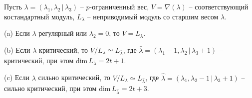 \begin{proposition}
Пусть $ \lambda = (\lambda_1, \lambda_2 \,|\, \lambda_3) $ -- $p$-ограниченный вес,  
$ V = \nabla(\lambda) $ -- соответствующий костандартный модуль, 
$ L_{\lambda} $ -- неприводимый модуль со старшим весом $\lambda$.

(a) Если $\lambda$ регулярный или $ \lambda_2 = 0 $, то $ V = L_{\lambda} $.

(b) Если $\lambda$ критический, то $ V/L_{\lambda} \simeq L_{\bar{\lambda}} $, 
где $ \bar{\lambda} = (\lambda_1 - 1, \lambda_2 \,|\, \lambda_3 + 1) $ -- критический, при этом $\mbox{dim}\, L_{\bar{\lambda}} = 2t + 1 $. 

(c) Если $\lambda$ сильно критический, то $ V/L_{\lambda} \simeq L_{\hat{\lambda}} $, 
где $ \hat{\lambda} = (\lambda_1, \lambda_2 - 1 \,|\, \lambda_3 + 1) $ -- сильно критический, при этом $\mbox{dim}\, L_{\hat{\lambda}} = 2t + 3 $.
\end{proposition}
